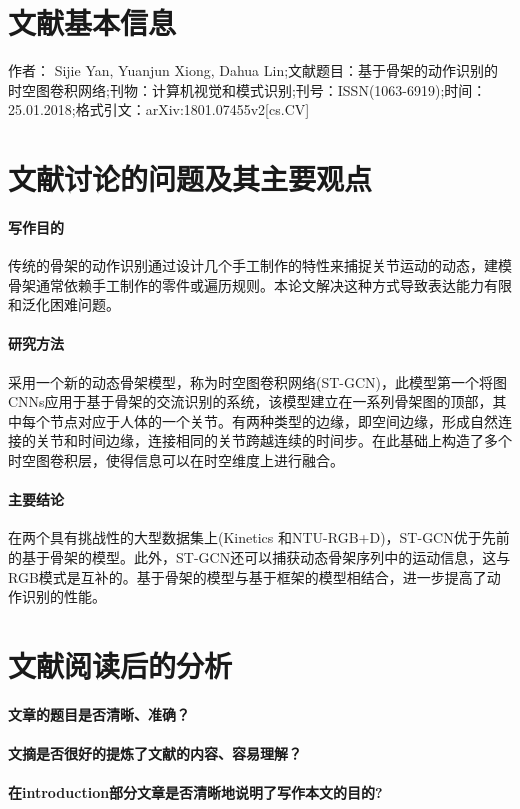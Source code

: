 \documentclass[a4paper,12pt,onecolumn,songti]{article}
\begin{document}
 
	\section{文献基本信息}
	作者： Sijie Yan, Yuanjun Xiong, Dahua Lin;文献题目：基于骨架的动作识别的时空图卷积网络;刊物：计算机视觉和模式识别;刊号：ISSN(1063-6919);时间：25.01.2018;格式引文：arXiv:1801.07455v2[cs.CV]
	\section{文献讨论的问题及其主要观点}
		\paragraph{写作目的}
		传统的骨架的动作识别通过设计几个手工制作的特性来捕捉关节运动的动态，建模骨架通常依赖手工制作的零件或遍历规则。本论文解决这种方式导致表达能力有限和泛化困难问题。
		\paragraph{研究方法}
		采用一个新的动态骨架模型，称为时空图卷积网络(ST-GCN)，此模型第一个将图CNNs应用于基于骨架的交流识别的系统，该模型建立在一系列骨架图的顶部，其中每个节点对应于人体的一个关节。有两种类型的边缘，即空间边缘，形成自然连接的关节和时间边缘，连接相同的关节跨越连续的时间步。在此基础上构造了多个时空图卷积层，使得信息可以在时空维度上进行融合。
		\paragraph{主要结论}
		在两个具有挑战性的大型数据集上(Kinetics 和NTU-RGB+D)，ST-GCN优于先前的基于骨架的模型。此外，ST-GCN还可以捕获动态骨架序列中的运动信息，这与RGB模式是互补的。基于骨架的模型与基于框架的模型相结合，进一步提高了动作识别的性能。
	\section{文献阅读后的分析}
		\paragraph{文章的题目是否清晰、准确？}
		\paragraph{文摘是否很好的提炼了⽂献的内容、容易理解？}
		\paragraph{在introduction部分⽂章是否清晰地说明了写作本⽂的目的?}
\end{document}
